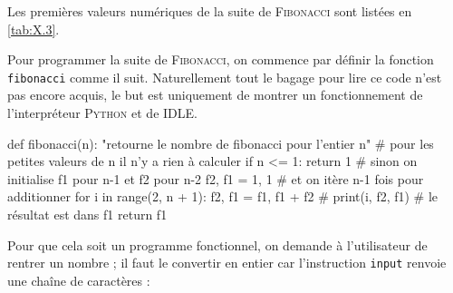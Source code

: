 
Les premières valeurs numériques de la suite de \textsc{Fibonacci} sont listées en \cref{tab:X.3}.

Pour programmer la suite de \textsc{Fibonacci}, on commence par définir la fonction \texttt{fibonacci} comme il suit. Naturellement tout le bagage pour lire ce code n'est pas encore acquis, le but est uniquement de montrer un fonctionnement de l'interpréteur \textsc{Python} et de IDLE.

\begin{nbjupyterin}[before skip=6pt, after skip=6pt]{1}
def fibonacci(n):
    "retourne le nombre de fibonacci pour l'entier n"
    # pour les petites valeurs de n il n'y a rien à calculer
    if n <= 1:
        return 1
    # sinon on initialise f1 pour n-1 et f2 pour n-2
    f2, f1 = 1, 1
    # et on itère n-1 fois pour additionner
    for i in range(2, n + 1):
        f2, f1 = f1, f1 + f2
    # print(i, f2, f1)
    # le résultat est dans f1
    return f1
\end{nbjupyterin}

Pour que cela soit un programme fonctionnel, on demande à l'utilisateur de rentrer un nombre ; il faut le convertir en entier car l'instruction \texttt{input} renvoie une chaîne de caractères :

